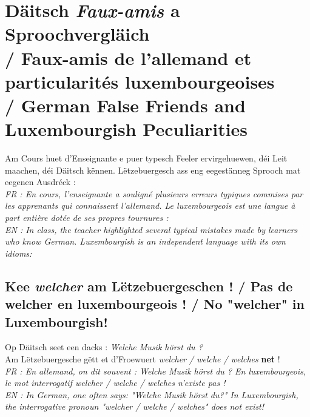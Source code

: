 \vspace{1.5em}

\section[Däitsch Faux-amis a Sproochvergläich / Luxembourgish vs German Nuances]{Däitsch \textit{Faux-amis} a Sproochvergläich \\/ Faux-amis de l'allemand et particularités luxembourgeoises \\/ German False Friends and Luxembourgish Peculiarities}

Am Cours huet d'Enseignante e puer typesch Feeler ervirgehuewen, déi Leit maachen, déi Däitsch kënnen. Lëtzebuergesch ass eng eegestänneg Sprooch mat eegenen Ausdréck : \\
\textit{FR : En cours, l'enseignante a souligné plusieurs erreurs typiques commises par les apprenants qui connaissent l'allemand. Le luxembourgeois est une langue à part entière dotée de ses propres tournures :} \\
\textit{EN : In class, the teacher highlighted several typical mistakes made by learners who know German. Luxembourgish is an independent language with its own idioms:}

\subsection{Kee \textit{\flqq welcher\frqq} am Lëtzebuergeschen ! / Pas de \flqq welcher\frqq{} en luxembourgeois ! / No "welcher" in Luxembourgish!}
Op Däitsch seet een dacks : \textit{\flqq Welche Musik hörst du ?\frqq} \\
Am Lëtzebuergesche gëtt et d'Froewuert \textit{\flqq welcher / welche / welches\frqq} \textbf{net} ! \\
\textit{FR : En allemand, on dit souvent : \flqq Welche Musik hörst du ?\frqq{} En luxembourgeois, le mot interrogatif \flqq welcher / welche / welches\frqq{} n'existe pas !} \\
\textit{EN : In German, one often says: "Welche Musik hörst du?" In Luxembourgish, the interrogative pronoun "welcher / welche / welches" does not exist!}

